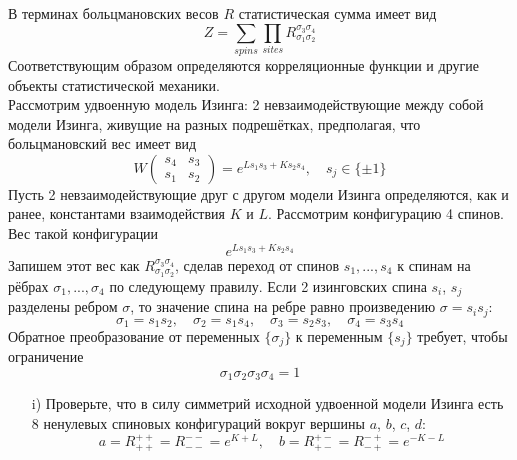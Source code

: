 \documentclass[12pt]{article}
\theoremstyle{definition}
\begin{document}
\begin{enumerate}
\begin{equation}
    \end{equation}
    В терминах больцмановских весов $R$ статистическая сумма имеет вид
    \begin{equation}
        Z=\sum\limits_{spins}\prod_{sites}R^{\sigma_3\sigma_4}_{\sigma_1\sigma_2}
    \end{equation}
    Соответствующим образом определяются корреляционные функции и другие объекты статистической механики.\\
    Рассмотрим удвоенную модель Изинга: 2 невзаимодействующие между собой модели Изинга, живущие на разных подрешётках, предполагая, что больцмановский вес имеет вид
    \begin{equation}
        W\begin{pmatrix}
            s_4 & s_3\\
            s_1 & s_2
        \end{pmatrix}=e^{Ls_1s_3+Ks_2s_4},\quad s_j\in\{\pm1\}
    \end{equation}
    Пусть 2 невзаимодействующие друг с другом модели Изинга определяются, как и ранее, константами взаимодействия $K$ и $L$. Рассмотрим конфигурацию 4 спинов. Вес такой конфигурации
    \begin{equation}
        e^{Ls_1s_3+Ks_2s_4}
    \end{equation}
    Запишем этот вес как $R^{\sigma_3\sigma_4}_{\sigma_1\sigma_2}$, сделав переход от спинов $s_1,...,s_4$ к спинам на рёбрах $\sigma_1,...,\sigma_4$ по следующему правилу. Если 2 изинговских спина $s_i$, $s_j$ разделены ребром $\sigma$, то значение спина на ребре равно произведению $\sigma=s_is_j$:
    \begin{equation}
        \sigma_1=s_1s_2,\quad\sigma_2=s_1s_4,\quad\sigma_3=s_2s_3,\quad\sigma_4=s_3s_4
    \end{equation}
    Обратное преобразование от переменных $\{\sigma_j\}$ к переменным $\{s_j\}$ требует, чтобы ограничение
    \begin{equation}
        \sigma_1\sigma_2\sigma_3\sigma_4=1
    \end{equation}
    \begin{itemize}
        \item[i)] Проверьте, что в силу симметрий исходной удвоенной модели Изинга есть 8 ненулевых спиновых конфигураций вокруг вершины $a$, $b$, $c$, $d$:
        \begin{equation}
            a=R^{++}_{++}=R^{--}_{--}=e^{K+L},\quad b=R^{+-}_{+-}=R^{-+}_{-+}=e^{-K-L}
        \end{equation}

\end{itemize}
\end{enumerate}
\end{document}
